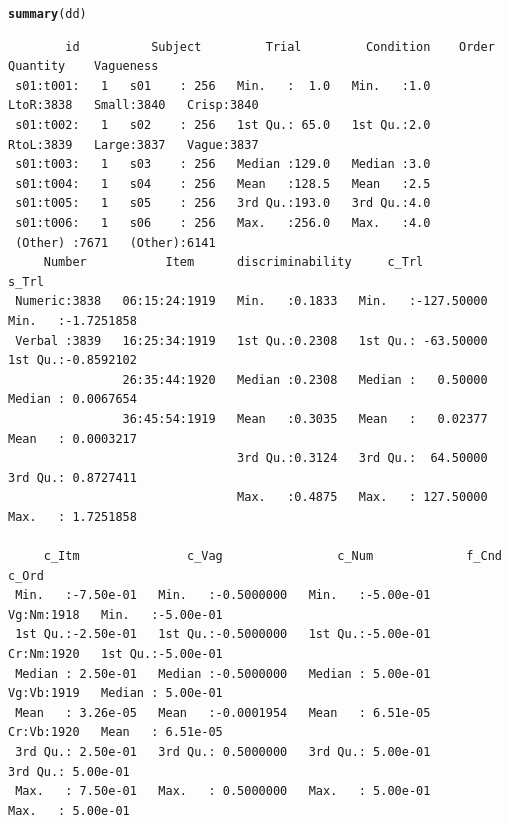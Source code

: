 \documentclass[a4paper,12pt]{article}\usepackage[]{graphicx}\usepackage[]{color}
\makeatletter
\newcommand{\hlstd}[1]{\textcolor[rgb]{0.345,0.345,0.345}{#1}}%
\newcommand{\hlkwd}[1]{\textcolor[rgb]{0.737,0.353,0.396}{\textbf{#1}}}%
\newenvironment{kframe}{%
 \def\at@end@of@kframe{}%
 \ifinner\ifhmode%
  \def\at@end@of@kframe{\end{minipage}}%
  \begin{minipage}{\columnwidth}%
 \fi\fi%
 \def\FrameCommand##1{\hskip\@totalleftmargin \hskip-\fboxsep
 \colorbox{shadecolor}{##1}\hskip-\fboxsep
     \hskip-\linewidth \hskip-\@totalleftmargin \hskip\columnwidth}%
 \MakeFramed {\advance\hsize-\width
   \@totalleftmargin\z@ \linewidth\hsize
   \@setminipage}}%
 {\par\unskip\endMakeFramed%
 \at@end@of@kframe}
\newenvironment{knitrout}{}{} %
\makeatother
\begin{document}
\begin{knitrout}\scriptsize
{}\color{fgcolor}\begin{kframe}
\begin{alltt}
\hlkwd{summary}\hlstd{(dd)}
\end{alltt}
\begin{verbatim}
        id          Subject         Trial         Condition    Order       Quantity    Vagueness   
 s01:t001:   1   s01    : 256   Min.   :  1.0   Min.   :1.0   LtoR:3838   Small:3840   Crisp:3840  
 s01:t002:   1   s02    : 256   1st Qu.: 65.0   1st Qu.:2.0   RtoL:3839   Large:3837   Vague:3837  
 s01:t003:   1   s03    : 256   Median :129.0   Median :3.0                                        
 s01:t004:   1   s04    : 256   Mean   :128.5   Mean   :2.5                                        
 s01:t005:   1   s05    : 256   3rd Qu.:193.0   3rd Qu.:4.0                                        
 s01:t006:   1   s06    : 256   Max.   :256.0   Max.   :4.0                                        
 (Other) :7671   (Other):6141                                                                      
     Number           Item      discriminability     c_Trl                s_Trl           
 Numeric:3838   06:15:24:1919   Min.   :0.1833   Min.   :-127.50000   Min.   :-1.7251858  
 Verbal :3839   16:25:34:1919   1st Qu.:0.2308   1st Qu.: -63.50000   1st Qu.:-0.8592102  
                26:35:44:1920   Median :0.2308   Median :   0.50000   Median : 0.0067654  
                36:45:54:1919   Mean   :0.3035   Mean   :   0.02377   Mean   : 0.0003217  
                                3rd Qu.:0.3124   3rd Qu.:  64.50000   3rd Qu.: 0.8727411  
                                Max.   :0.4875   Max.   : 127.50000   Max.   : 1.7251858  
                                                                                          
     c_Itm               c_Vag                c_Num             f_Cnd          c_Ord          
 Min.   :-7.50e-01   Min.   :-0.5000000   Min.   :-5.00e-01   Vg:Nm:1918   Min.   :-5.00e-01  
 1st Qu.:-2.50e-01   1st Qu.:-0.5000000   1st Qu.:-5.00e-01   Cr:Nm:1920   1st Qu.:-5.00e-01  
 Median : 2.50e-01   Median :-0.5000000   Median : 5.00e-01   Vg:Vb:1919   Median : 5.00e-01  
 Mean   : 3.26e-05   Mean   :-0.0001954   Mean   : 6.51e-05   Cr:Vb:1920   Mean   : 6.51e-05  
 3rd Qu.: 2.50e-01   3rd Qu.: 0.5000000   3rd Qu.: 5.00e-01                3rd Qu.: 5.00e-01  
 Max.   : 7.50e-01   Max.   : 0.5000000   Max.   : 5.00e-01                Max.   : 5.00e-01  
                                                                                              

\end{verbatim}
\end{kframe}
\end{knitrout}
\end{document}
